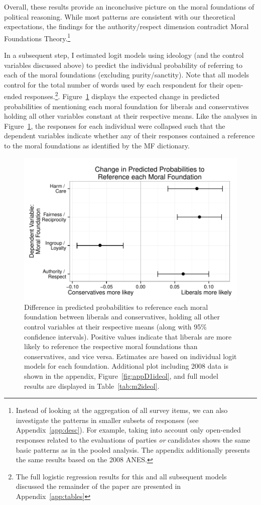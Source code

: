\documentclass[12pt]{article}
\begin{document}
Overall, these results provide an inconclusive picture on the moral foundations of political reasoning. While most patterns are consistent with our theoretical expectations, the findings for the authority/respect dimension contradict Moral Foundations Theory.\footnote{Instead of looking at the aggregation of all survey items, we can also investigate the patterns in smaller subsets of responses (see Appendix~\ref{app:desc}). For example, taking into account only open-ended responses related to the evaluations of parties \textit{or} candidates shows the same basic patterns as in the pooled analysis. The appendix additionally presents the same results based on the 2008 ANES.}

In a subsequent step, I estimated logit models using ideology (and the control variables discussed above) to predict the individual probability of referring to each of the moral foundations (excluding purity/sanctity). Note that all models control for the total number of words used by each respondent for their open-ended responses.\footnote{The full logistic regression results for this and all subsequent models discussed the remainder of the paper are presented in Appendix~\ref{app:tables}}. Figure~\ref{fig:2ideol} displays the expected change in predicted probabilities of mentioning each moral foundation for liberals and conservatives holding all other variables constant at their respective means. Like the analyses in Figure~\ref{fig:2ideol}, the responses for each individual were collapsed such that the dependent variables indicate whether any of their responses contained a reference to the moral foundations as identified by the MF dictionary. 

\begin{figure}[h]\centering
\includegraphics[scale=.9]{../calc/fig/fig2ideol.pdf}
\caption{Difference in predicted probabilities to reference each moral foundation between liberals and conservatives, holding all other control variables at their respective means (along with 95\% confidence intervals). Positive values indicate that liberals are more likely to reference the respective moral foundations than conservatives, and vice versa. Estimates are based on individual logit models for each foundation. Additional plot including 2008 data is shown in the appendix, Figure~\ref{fig:appD1ideol}, and full model results are displayed in Table~\ref{tab:m2ideol}.}\label{fig:2ideol}
\end{figure}
\end{document}
